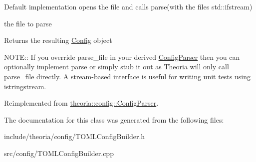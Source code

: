 Default implementation opens the file and calls parse(with the file\textquotesingle{}s std\+::ifstream)

the file to parse \begin{DoxyReturn}{Returns}
the resulting \hyperlink{classtheoria_1_1config_1_1Config}{Config} object
\end{DoxyReturn}
N\+O\+TE\+:\+: If you override parse\+\_\+file in your derived \hyperlink{classtheoria_1_1config_1_1ConfigParser}{Config\+Parser} then you can optionally implement parse or simply stub it out as Theoria will only call parse\+\_\+file directly. A stream-\/based interface is useful for writing unit tests using istringstream. 

Reimplemented from \hyperlink{classtheoria_1_1config_1_1ConfigParser_a4eca80a9831324237f2a2aa9a5018c89}{theoria\+::config\+::\+Config\+Parser}.



The documentation for this class was generated from the following files\+:\begin{DoxyCompactItemize}
\item 
include/theoria/config/T\+O\+M\+L\+Config\+Builder.\+h\item 
src/config/T\+O\+M\+L\+Config\+Builder.\+cpp\end{DoxyCompactItemize}
